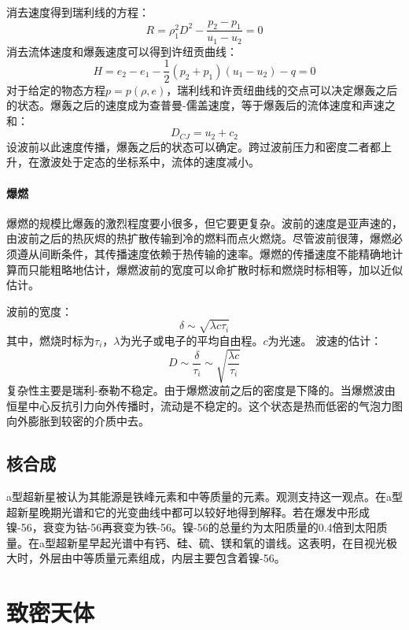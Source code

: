 消去速度得到瑞利线的方程：
\begin{equation}
	R=\rho_{1}^2D^2-\frac{p_{2}-p_{1}}{u_{1}-u_{2}}=0
\end{equation}
消去流体速度和爆轰速度可以得到许纽贡曲线：
\begin{equation}
	H=e_{2}-e_{1}-\frac{1}{2}(p_{2}+p_{1})(u_{1}-u_{2})-q=0
\end{equation}
对于给定的物态方程$p=p(\rho,e)$，瑞利线和许贡纽曲线的交点可以决定爆轰之后的状态。爆轰之后的速度成为查普曼-儒盖速度，等于爆轰后的流体速度和声速之和：
\begin{equation}
	D_{CJ}=u_{2}+c_{2}
\end{equation}
设波前以此速度传播，爆轰之后的状态可以确定。跨过波前压力和密度二者都上升，在激波处于定态的坐标系中，流体的速度减小。
\paragraph{爆燃}
爆燃的规模比爆轰的激烈程度要小很多，但它要更复杂。波前的速度是亚声速的，由波前之后的热灰烬的热扩散传输到冷的燃料而点火燃烧。尽管波前很薄，爆燃必须遵从间断条件，其传播速度依赖于热传输的速率。爆燃的传播速度不能精确地计算而只能粗略地估计，爆燃波前的宽度可以命扩散时标和燃烧时标相等，加以近似估计。

波前的宽度：
\begin{equation}
	\delta\sim\sqrt{\lambda c\tau_{i}}
\end{equation}
其中，燃烧时标为$\tau_{i}$，$\lambda$为光子或电子的平均自由程。$c$为光速。
波速的估计：
\begin{equation}
	D\sim\frac{\delta}{\tau_{i}}\sim\sqrt{\frac{\lambda c}{\tau_{i}}}
\end{equation}
复杂性主要是瑞利-泰勒不稳定。由于爆燃波前之后的密度是下降的。当爆燃波由恒星中心反抗引力向外传播时，流动是不稳定的。这个状态是热而低密的气泡力图向外膨胀到较密的介质中去。
\subsection{核合成}
a型超新星被认为其能源是铁峰元素和中等质量的元素。观测支持这一观点。在a型超新星晚期光谱和它的光变曲线中都可以较好地得到解释。若在爆发中形成镍-56，衰变为钴-56再衰变为铁-56。镍-56的总量约为太阳质量的0.4倍到太阳质量。在a型超新星早起光谱中有钙、硅、硫、镁和氧的谱线。这表明，在目视光极大时，外层由中等质量元素组成，内层主要包含着镍-56。
\section{致密天体}
